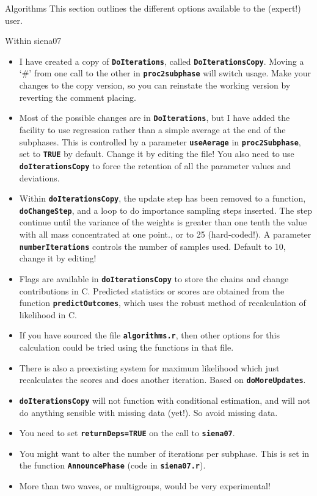 \documentclass[12pt, a4paper]{article}
\makeatletter
\renewcommand{\=}{\,=\,}
\newcommand{\+}{\,+\,}
\newcommand{\sfn}[1]{\textbf{\texttt{#1}}}
\renewcommand{\section}{\@startsection{section}{1}
                {0pt}{\baselineskip}{0.5\baselineskip}
                {\centering\sffamily} }
\renewcommand{\subsection}{\@startsection{subsection}{2}
                {0pt}{0.7\baselineskip}{0.3\baselineskip}
                {\sffamily} }
\makeatother
\begin{document}
\section{Algorithms}
This section outlines the different options available to the (expert!) user.
\subsection{Within siena07}
\begin{itemize}
\item I have created a copy of \sfn{DoIterations}, called
  \sfn{DoIterationsCopy}. Moving a `\#' from one call to the other in
  \sfn{proc2subphase} will switch usage. Make your changes to the copy version,
  so you can reinstate the working version by reverting the comment placing.
\item Most of the possible changes are in \sfn{DoIterations}, but I have added
  the facility to use regression rather than a simple average at the end of the
  subphases. This is controlled by a parameter \sfn{useAerage} in
  \sfn{proc2Subphase}, set to \sfn{TRUE} by default. Change it by editing the
  file! You also need to use \sfn{doIterationsCopy} to force the retention of
  all the parameter values and deviations.
\item Within \sfn{doIterationsCopy}, the update step has been removed to a
  function, \sfn{doChangeStep}, and a loop to do importance sampling steps
  inserted. The step continue until the variance of the weights is greater than
  one tenth the value with all mass concentrated at one point., or to 25
  (hard-coded!). A parameter \sfn{numberIterations} controls the number of
  samples used. Default to 10, change it by editing!
\item Flags are available in \sfn{doIterationsCopy} to store the chains and
  change contributions in C. Predicted statistics or scores are obtained from
  the function \sfn{predictOutcomes}, which uses the robust method of
  recalculation of likelihood in C.
\item If you have sourced the file \sfn{algorithms.r}, then other options for
  this calculation could be tried using the functions in that file.
\item There is also a preexisting system for maximum likelihood which just
  recalculates the scores and does another iteration. Based on
  \sfn{doMoreUpdates}.
\item \sfn{doIterationsCopy} will not function with conditional estimation,
and will not do anything sensible with missing data (yet!). So avoid missing
data.
\item You need to set \sfn{returnDeps=TRUE} on the call to \sfn{siena07}.
\item You might want to alter the number of iterations per subphase. This is set
  in the function \sfn{AnnouncePhase} (code in \sfn{siena07.r}).
\item More than two waves, or multigroups, would be very experimental!
\end{itemize}
\end{document}
